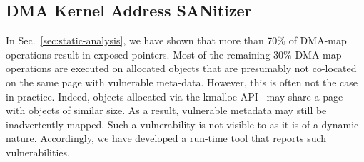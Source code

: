 \subsection{DMA Kernel Address SANitizer}\label{sec:dma-kasan} 

In Sec.~\ref{sec:static-analysis}, we have shown that more than 70\% of DMA-map operations result in exposed pointers. 
Most of the remaining 30\% DMA-map operations are executed on allocated objects that are presumably not co-located on the same page with vulnerable meta-data. However, this is often not the case in practice.
Indeed, objects allocated via the kmalloc API~\cite{Cor07} may share a page with objects of similar size. As a result, vulnerable metadata may still be inadvertently mapped. 
%
Such a vulnerability is not visible to \tool as it is of a dynamic nature. Accordingly, we have developed a run-time tool that reports such vulnerabilities. 

